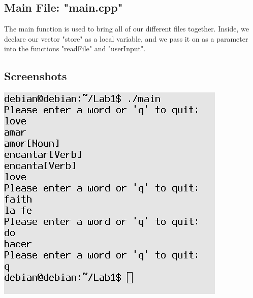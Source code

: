 \documentclass{article}
\begin{document}
\subsection{Main File: "main.cpp"}
The main function is used to bring all of our different files
together. Inside, we declare our vector "store" as a local variable,
and we pass it on as a parameter into the functions "readFile" and
"userInput".
\clearpage
\subsection{Screenshots}
\includegraphics[scale=.8]{test1.png}
\end{document}
